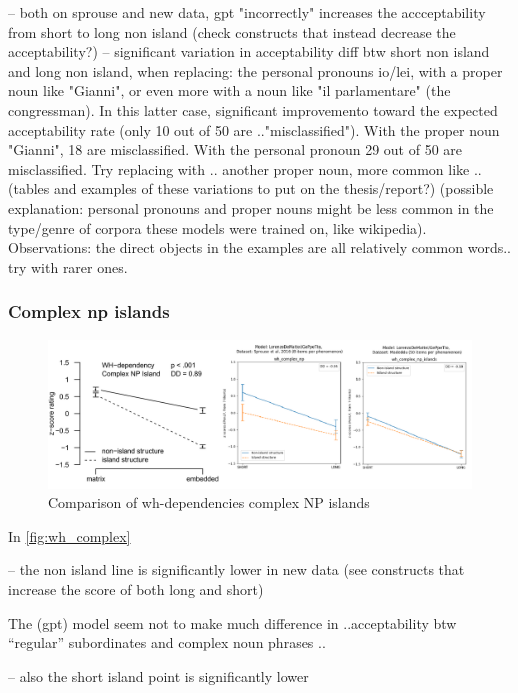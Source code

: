 -- both on sprouse and new data, gpt "incorrectly" increases the accceptability from short to long non island (check constructs that instead decrease the acceptability?)
-- significant variation in acceptability diff btw short non island and long non island, when replacing: the personal pronouns io/lei, with a proper noun like "Gianni", or even more with a noun like "il parlamentare" (the congressman). In this latter case, significant improvemento toward the expected acceptability rate (only 10 out of 50 are .."misclassified"). With the proper noun "Gianni", 18 are misclassified. With the personal pronoun 29 out of 50 are misclassified.
Try replacing with .. another proper noun, more common like ..
(tables and examples of these variations to put on the thesis/report?)
(possible explanation: personal pronouns and proper nouns might be less common in the type/genre of corpora these models were trained on, like wikipedia).
Observations: the direct objects in the examples are all relatively common words..
try with rarer ones.

\subsubsection{Complex np islands}

\begin{figure}
	\centering
	\includegraphics[width=1\textwidth]{images/Chapter1/combined_wh-complex.png} 
	\caption{Comparison of wh-dependencies complex NP islands} 
	\label{fig:wh_complex} %
\end{figure}

In \autoref{fig:wh_complex} 

-- the non island line is significantly lower in new data (see constructs that increase the score of both long and short)

The (gpt) model seem not to make much difference in ..acceptability btw “regular” subordinates and complex noun phrases ..

-- also the short island point is significantly lower


